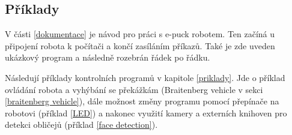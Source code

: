 \subsection*{Příklady}

V části \ref{dokumentace} je návod pro práci s e-puck robotem. Ten začíná u
připojení robota k počítači a končí zasíláním příkazů. Také je zde uveden
ukázkový program a následně rozebrán řádek po řádku.

Následují příklady kontrolních programů v kapitole \ref{priklady}. Jde o
příklad ovládání robota a vyhýbání se překážkám (Braitenberg vehicle v
sekci \ref{braitenberg vehicle}), dále možnost změny programu pomocí
přepínače na robotovi (příklad \ref{LED}) a nakonec využití kamery a
externích knihoven pro detekci obličejů (příklad \ref{face detection}).

